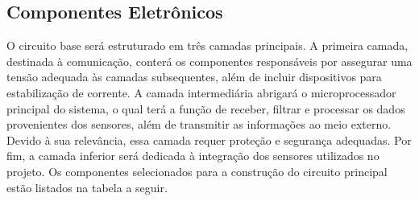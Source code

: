 \documentclass[a4paper, 12pt]{article}
\begin{document}
\subsection{Componentes Eletrônicos} 
    O circuito base será estruturado em três camadas principais. A primeira camada, destinada à comunicação, conterá os componentes responsáveis por assegurar uma tensão adequada às camadas subsequentes, além de incluir dispositivos para estabilização de corrente. A camada intermediária abrigará o microprocessador principal do sistema, o qual terá a função de receber, filtrar e processar os dados provenientes dos sensores, além de transmitir as informações ao meio externo. Devido à sua relevância, essa camada requer proteção e segurança adequadas. Por fim, a camada inferior será dedicada à integração dos sensores utilizados no projeto. Os componentes selecionados para a construção do circuito principal estão listados na tabela a seguir.
\end{document}
